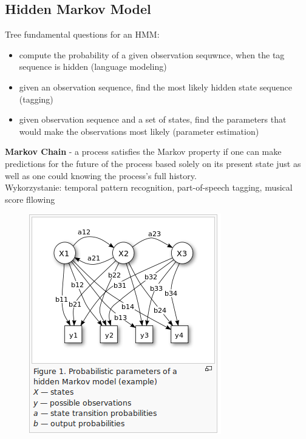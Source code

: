 \documentclass[10pt,a4paper]{article}
\begin{document}
\subsection{Hidden Markov Model}
Tree fundamental questions for an HMM:
  \begin{itemize}
    \item compute the probability of a given observation sequwnce, when the tag sequence is hidden (language modeling)
    \item given an observation sequence, find the most likely hidden state sequence (tagging)
    \item given observation sequence and a set of states, find the parameters that would make the observations most likely (parameter estimation)
  \end{itemize}
\textbf{Markov Chain} - a process satisfies the Markov property if one can make predictions for the future of the process based solely on its present state just as well as one could knowing the process's full history.\\
Wykorzystanie: temporal pattern recognition, part-of-speech tagging, musical score fllowing
\begin{figure}[H]
  \centering
    \includegraphics[scale=0.70]{images/model.png}
\end{figure}
\end{document}
